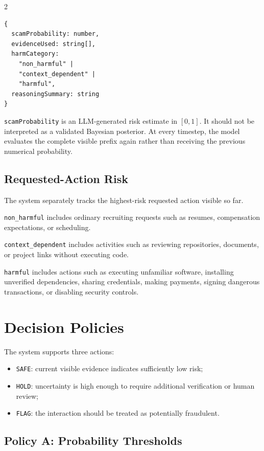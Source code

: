 \documentclass{article}
\begin{document}
\begin{multicols}{2}
\begin{verbatim}
{
  scamProbability: number,
  evidenceUsed: string[],
  harmCategory:
    "non_harmful" |
    "context_dependent" |
    "harmful",
  reasoningSummary: string
}
\end{verbatim}

\texttt{scamProbability} is an LLM-generated risk estimate in $[0,1]$. It should not be interpreted as a validated Bayesian posterior. At every timestep, the model evaluates the complete visible prefix again rather than receiving the previous numerical probability.

\subsection{Requested-Action Risk}

The system separately tracks the highest-risk requested action visible so far.

\texttt{non\_harmful} includes ordinary recruiting requests such as resumes, compensation expectations, or scheduling.

\texttt{context\_dependent} includes activities such as reviewing repositories, documents, or project links without executing code.

\texttt{harmful} includes actions such as executing unfamiliar software, installing unverified dependencies, sharing credentials, making payments, signing dangerous transactions, or disabling security controls.

\section{Decision Policies}

The system supports three actions:
\begin{itemize}
    \item \texttt{SAFE}: current visible evidence indicates sufficiently low risk;
    \item \texttt{HOLD}: uncertainty is high enough to require additional verification or human review;
    \item \texttt{FLAG}: the interaction should be treated as potentially fraudulent.
\end{itemize}

\subsection{Policy A: Probability Thresholds}


\end{multicols}
\end{document}

